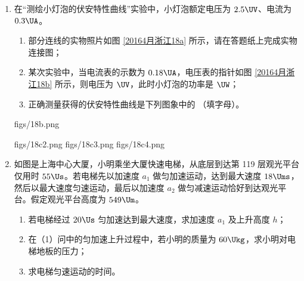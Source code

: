 \documentclass[\gkver]{gaokaozhenti}
\begin{document}
\begin{enumerate}
\item
在“测绘小灯泡的伏安特性曲线”实验中，小灯泡额定电压为 $2.5\UV$、电流为 $0.3\UA$。
\begin{enumerate}
	\item
	部分连线的实物照片如图 \ref{20164月浙江18a} 所示，请在答题纸上完成实物连接图；
	\item
	某次实验中，当电流表的示数为 $0.18\UA$，电压表的指针如图 \ref{20164月浙江18b} 所示，则电压为 $\UV$，此时小灯泡的功率是 $\UW$；
	\item
	正确测量获得的伏安特性曲线是下列图象中的 （填字母）。
\end{enumerate}

{figs/18b.png}

{figs/18c2.png}
{figs/18c3.png}
{figs/18c4.png}


\item
如图是上海中心大厦，小明乘坐大厦快速电梯，从底层到达第 119 层观光平台仅用时 $55\Us$。若电梯先以加速度 $a_{1}$ 做匀加速运动，达到最大速度 $18\Ums$，然后以最大速度匀速运动，最后以加速度 $a_{2}$ 做匀减速运动恰好到达观光平台。假定观光平台高度为 $549\Um$。
\begin{enumerate}
	\item
	若电梯经过 $20\Us$ 匀加速达到最大速度，求加速度 $a_{1}$ 及上升高度 $h$；
	\item
	在（1）问中的匀加速上升过程中，若小明的质量为 $60\Ukg$，求小明对电梯地板的压力；
	\item
	求电梯匀速运动的时间。
\end{enumerate}


\end{enumerate}
\end{document}
